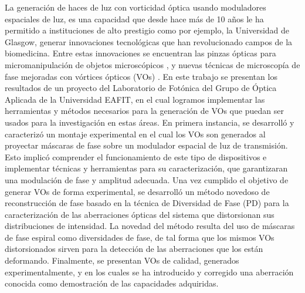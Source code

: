 




\begin{resumen}        %

La generación de haces de luz con vorticidad óptica usando moduladores
espaciales de luz, es una capacidad que desde hace 
más de 10 años le ha
permitido a instituciones de alto prestigio como por ejemplo, la
Universidad de Glasgow, generar
innovaciones tecnológicas que han revolucionado campos de la
biomedicina. Entre estas innovaciones se encuentran las pinzas
ópticas para micromanipulación de objetos microscópicos , y nuevas
técnicas de microscopía de fase mejoradas con vórtices ópticos (VOs) .  
En este trabajo se presentan los resultados de un proyecto del Laboratorio de Fotónica del Grupo de Óptica Aplicada de
la Universidad EAFIT, en el cual logramos implementar las herramientas y métodos
necesarios para la generación de VOs que puedan ser usados para la
investigación en estas áreas. 
En primera instancia, se desarrolló y caracterizó un montaje experimental
en el cual los VOs son generados al proyectar máscaras de
fase sobre un modulador espacial de luz de transmisión. Esto implicó
comprender el funcionamiento de este tipo de dispositivos e
implementar técnicas y herramientas para su caracterización, que garantizaran una
modulación de fase y amplitud adecuada. Una vez cumplido el objetivo de generar VOs
de forma experimental, se desarrolló un método novedoso de reconstrucción de fase basado en
la técnica de Diversidad de Fase (PD) para la caracterización de las
aberraciones ópticas del sistema que distorsionan sus distribuciones de intensidad. La
novedad del método resulta del uso de máscaras de fase espiral como
diversidades de fase, de tal forma que los mismos VOs distorsionados sirven
para la detección de las aberraciones que los están deformando. 
Finalmente, se presentan VOs de calidad, generados experimentalmente, y en los cuales
se ha introducido y corregido una aberración conocida como
demostración de las capacidades adquiridas.
\end{resumen}





